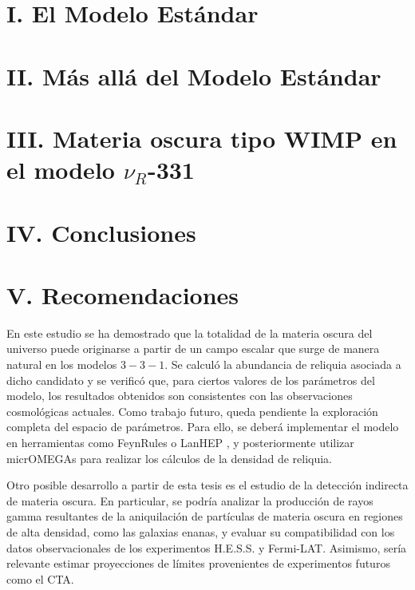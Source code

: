 \documentclass[11pt,spanish]{report}
\begin{document}
\chapter[\hspace{-0.185in}.  El Modelo Estándar]{I. El Modelo Estándar}


\chapter[\hspace{-0.15in}.  Más allá del Modelo Estándar]{II. Más allá del Modelo Estándar}


\chapter[\hspace{-0.1in}.  Materia oscura tipo WIMP en el modelo $\nu_R$-331]{III. Materia oscura tipo WIMP en el modelo $\nu_R$-331}


\chapter[\hspace{-0.075in}.  Conclusiones]{IV. Conclusiones}


\chapter[\hspace{-0.125in}.  Recomendaciones]{V. Recomendaciones}

En este estudio se ha demostrado que la totalidad de la materia oscura del universo puede originarse a partir de un campo escalar que surge de manera natural en los modelos $3-3-1$. Se calculó la abundancia de reliquia asociada a dicho candidato y se verificó que, para ciertos valores de los parámetros del modelo, los resultados obtenidos son consistentes con las observaciones cosmológicas actuales. Como trabajo futuro, queda pendiente la exploración completa del espacio de parámetros. Para ello, se deberá implementar el modelo en herramientas como FeynRules \cite{FeynRules,FeynRulesManual} o LanHEP \cite{LanHEP,LanHEPManual}, y posteriormente utilizar micrOMEGAs \cite{micrOMEGAs,micrOMEGAs5} para realizar los cálculos de la densidad de reliquia.

Otro posible desarrollo a partir de esta tesis es el estudio de la detección indirecta de materia oscura. En particular, se podría analizar la producción de rayos gamma resultantes de la aniquilación de partículas de materia oscura en regiones de alta densidad, como las galaxias enanas, y evaluar su compatibilidad con los datos observacionales de los experimentos H.E.S.S. y Fermi-LAT. Asimismo, sería relevante estimar proyecciones de límites provenientes de experimentos futuros como el CTA.
\end{document}
